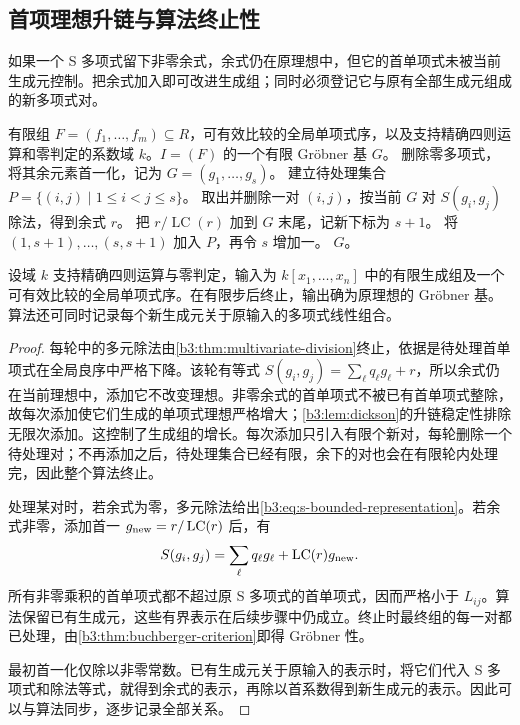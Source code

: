 \subsection{首项理想升链与算法终止性}
\label{b3:subsec:0802:02}

如果一个 S 多项式留下非零余式，余式仍在原理想中，但它的首单项式未被当前生成元控制。把余式加入即可改进生成组；同时必须登记它与原有全部生成元组成的新多项式对。

\begin{algorithm}[htbp]
	\caption{Buchberger}
	\label{b3:alg:buchberger}
	\begin{algorithmsteps}{有限组 \(F=(f_1,\ldots,f_m)\subseteq R\)，可有效比较的全局单项式序，以及支持精确四则运算和零判定的系数域 \(k\)。}{\(I=(F)\) 的一个有限 Gröbner 基 \(G\)。}
		\State 删除零多项式，将其余元素首一化，记为 \(G=(g_1,\ldots,g_s)\)。
		\State 建立待处理集合 \(P=\bigl\{(i,j)\mid1\le i<j\le s\bigr\}\)。
			\State 取出并删除一对 \((i,j)\)，按当前 \(G\) 对 \(S(g_i,g_j)\) 除法，得到余式 \(r\)。
				\State 把 \(r/\operatorname{LC}(r)\) 加到 \(G\) 末尾，记新下标为 \(s+1\)。
				\State 将 \((1,s+1),\ldots,(s,s+1)\) 加入 \(P\)，再令 \(s\) 增加一。
			\EndIf
		\EndWhile
		\State \Return \(G\)。
	\end{algorithmsteps}
\end{algorithm}

\begin{theorem}\label{b3:thm:buchberger-algorithm}
	设域 \(k\) 支持精确四则运算与零判定，输入为 \(k[x_1,\ldots,x_n]\) 中的有限生成组及一个可有效比较的全局单项式序。在有限步后终止，输出确为原理想的 Gröbner 基。算法还可同时记录每个新生成元关于原输入的多项式线性组合。
\end{theorem}
\begin{proof}
	每轮中的多元除法由\cref{b3:thm:multivariate-division}终止，依据是待处理首单项式在全局良序中严格下降。该轮有等式 \(S(g_i,g_j)=\sum_\ell q_\ell g_\ell+r\)，所以余式仍在当前理想中，添加它不改变理想。非零余式的首单项式不被已有首单项式整除，故每次添加使它们生成的单项式理想严格增大；\cref{b3:lem:dickson}的升链稳定性排除无限次添加。这控制了生成组的增长。每次添加只引入有限个新对，每轮删除一个待处理对；不再添加之后，待处理集合已经有限，余下的对也会在有限轮内处理完，因此整个算法终止。

	处理某对时，若余式为零，多元除法给出\eqref{b3:eq:s-bounded-representation}。若余式非零，添加首一 \(g_{\rm new}=r/\operatorname{LC}(r)\) 后，有
	\[
		S(g_i,g_j)=\sum_\ell q_\ell g_\ell+ \operatorname{LC}(r)g_{\rm new}.
	\]
	所有非零乘积的首单项式都不超过原 S 多项式的首单项式，因而严格小于 \(L_{ij}\)。算法保留已有生成元，这些有界表示在后续步骤中仍成立。终止时最终组的每一对都已处理，由\cref{b3:thm:buchberger-criterion}即得 Gröbner 性。

	最初首一化仅除以非零常数。已有生成元关于原输入的表示时，将它们代入 S 多项式和除法等式，就得到余式的表示，再除以首系数得到新生成元的表示。因此可以与算法同步，逐步记录全部关系。
\end{proof}

